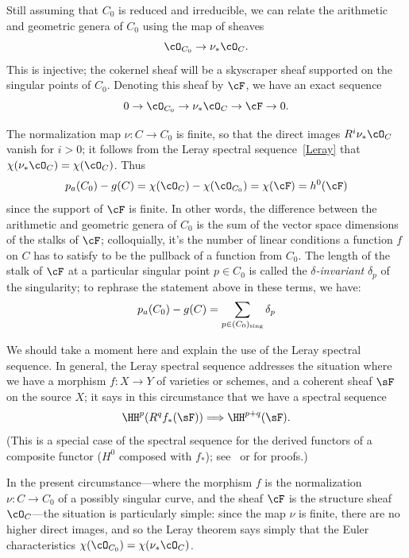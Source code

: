 Still assuming that $C_0$ is reduced and irreducible, we can relate the arithmetic and geometric genera of $C_0$ using the map of sheaves
$$
\cO_{C_0} \to \nu_*\cO_C.
$$
This is injective; the cokernel sheaf will be a skyscraper sheaf supported on the singular points of $C_0$. Denoting this sheaf by $\cF$, we have an exact sequence
$$
0 \to \cO_{C_0} \to \nu_*\cO_C \to \cF \to 0.
$$

The normalization map $\nu: C \to C_0$ is finite, so that the direct images $R^i\nu_*\cO_C$ vanish for $i > 0$; it follows from the Leray spectral sequence~\ref{Leray} that $\chi(\nu_*\cO_C) = \chi(\cO_C)$. Thus
$$
p_a(C_0) - g(C) =  \chi(\cO_{C}) -   \chi(\cO_{C_0}) = \chi(\cF) = h^0(\cF) 
$$ 
since the support of $\cF$ is finite.
In other words, the difference between the arithmetic and geometric genera of $C_0$ is the sum of the vector space dimensions of the stalks of $\cF$; colloquially, it's the number of linear conditions a function $f$ on $C$ has to satisfy to be the pullback of a function from $C_0$. The length of the stalk of $\cF$ at a particular singular point $p \in C_0$ is called the \emph{$\delta$-invariant} $\delta_p$ of the singularity; to rephrase the statement above in these terms, we have:
$$
p_a(C_0) - g(C) = \sum_{p \in (C_0)_{\rm sing}} \delta_p
$$ 

We should take a moment here and explain the use of the Leray spectral sequence. In general, the Leray spectral sequence addresses the situation where we have  a morphism $f:X\to Y$ of varieties or schemes, 
 and a coherent sheaf $\sF$  on the source $X$; it says in this circumstance that we have a spectral sequence
  $$
  \HH^p(R^qf_*(\sF)) \Longrightarrow \HH^{p+q}(\sF).
  $$
(This is a special case of the spectral sequence for the derived functors of a composite functor ($H^0$ composed with $f_*$);
see~\cite[II.4.17.1]{Godement} or \cite[Section III.7]{Gelfand-Manin} for proofs.)

In the present circumstance---where the morphism $f$ is the normalization $\nu : C \to C_0$ of a possibly singular curve, and the sheaf $\cF$ is the structure sheaf $\cO_C$---the situation is particularly simple: since the map $\nu$ is finite, there are no higher direct images, and so the Leray theorem says simply that the Euler characteristics $\chi(\cO_{C_0}) = \chi(\nu_*\cO_C)$.


